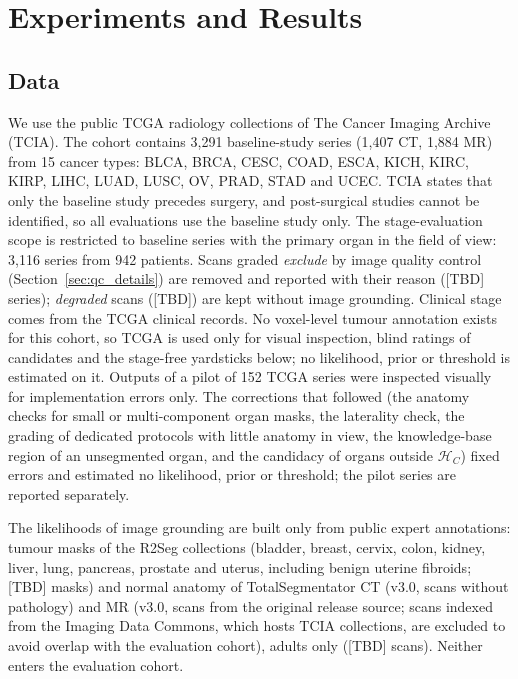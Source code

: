 \documentclass[fleqn,10pt]{olplainarticle}
\begin{document}
\section{Experiments and Results}
\label{sec:results}

\subsection{Data}
We use the public TCGA radiology collections of The Cancer Imaging Archive (TCIA). The cohort contains 3{,}291
baseline-study series (1{,}407 CT, 1{,}884 MR) from 15 cancer types: BLCA, BRCA, CESC, COAD, ESCA, KICH, KIRC, KIRP,
LIHC, LUAD, LUSC, OV, PRAD, STAD and UCEC. TCIA states that only the baseline study precedes surgery, and post-surgical
studies cannot be identified, so all evaluations use the baseline study only. The stage-evaluation scope is restricted
to baseline series with the primary organ in the field of view: 3{,}116 series from 942 patients. Scans graded \emph{exclude} by image quality control (Section~\ref{sec:qc_details}) are removed and reported with their reason ([TBD] series); \emph{degraded} scans ([TBD]) are kept without image grounding. Clinical stage comes
from the TCGA clinical records. No voxel-level tumour annotation exists for this cohort, so TCGA is used only for visual
inspection, blind ratings of candidates and the stage-free yardsticks below; no likelihood, prior or threshold is estimated
on it. Outputs of a pilot of 152 TCGA series were inspected visually for implementation errors only. The corrections that
followed (the anatomy checks for small or multi-component organ masks, the laterality check, the grading of dedicated
protocols with little anatomy in view, the knowledge-base region of an unsegmented organ, and the candidacy of organs
outside $\mathcal{H}_C$) fixed errors and estimated no likelihood, prior or threshold; the pilot series are reported
separately.

The likelihoods of image grounding are built only from public expert annotations: tumour masks of the R2Seg collections
(bladder, breast, cervix, colon, kidney, liver, lung, pancreas, prostate and uterus, including benign uterine fibroids;
[TBD] masks) and normal anatomy of
TotalSegmentator CT (v3.0, scans without pathology) and MR (v3.0, scans from the original release source; scans indexed from the
Imaging Data Commons, which hosts TCIA collections, are excluded to avoid overlap with the evaluation cohort), adults only ([TBD] scans). Neither enters the evaluation cohort.
\end{document}
